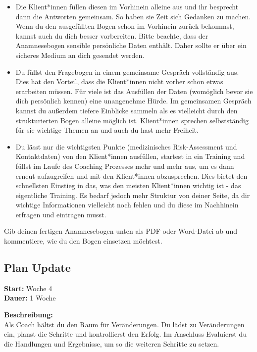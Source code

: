 \documentclass[
  letterpaper,
  DIV=11,
  numbers=noendperiod]{scrreprt}
\begin{document}
\begin{itemize}
\item
  Die Klient*innen füllen diesen im Vorhinein alleine aus und ihr
  besprecht dann die Antworten gemeinsam. So haben sie Zeit sich
  Gedanken zu machen. Wenn du den ausgefüllten Bogen schon im Vorhinein
  zurück bekommst, kannst auch du dich besser vorbereiten. Bitte
  beachte, dass der Anamnesebogen sensible persönliche Daten enthält.
  Daher sollte er über ein sicheres Medium an dich gesendet werden.
\item
  Du füllst den Fragebogen in einem gemeinsame Gespräch vollständig aus.
  Dies hat den Vorteil, dass die Klient*innen nicht vorher schon etwas
  erarbeiten müssen. Für viele ist das Ausfüllen der Daten (womöglich
  bevor sie dich persönlich kennen) eine unangenehme Hürde. Im
  gemeinsamen Gespräch kannst du außerdem tiefere Einblicke sammeln als
  es vielleicht durch den strukturierten Bogen alleine möglich ist.
  Klient*innen sprechen selbstständig für sie wichtige Themen an und
  auch du hast mehr Freiheit.
\item
  Du lässt nur die wichtigsten Punkte (medizinisches Risk-Assessment und
  Kontaktdaten) von den Klient*innen ausfüllen, startest in ein Training
  und füllst im Laufe des Coaching Prozesses mehr und mehr aus, um es
  dann erneut aufzugreifen und mit den Klient*innen abzusprechen. Dies
  bietet den schnellsten Einstieg in das, was den meisten Klient*innen
  wichtig ist - das eigentliche Training. Es bedarf jedoch mehr Struktur
  von deiner Seite, da dir wichtige Informationen vielleicht noch fehlen
  und du diese im Nachhinein erfragen und eintragen musst.
\end{itemize}

Gib deinen fertigen Anamnesebogen unten als PDF oder Word-Datei ab und
kommentiere, wie du den Bogen einsetzen möchtest.

\subsection{Plan Update}\label{plan-update}

\textbf{Start:} Woche 4\\
\textbf{Dauer:} 1 Woche

\textbf{Beschreibung:}\\
Als Coach hältst du den Raum für Veränderungen. Du lädst zu
Veränderungen ein, planst die Schritte und kontrollierst den Erfolg. Im
Anschluss Evaluierst du die Handlungen und Ergebnisse, um so die
weiteren Schritte zu setzen.
\end{document}
